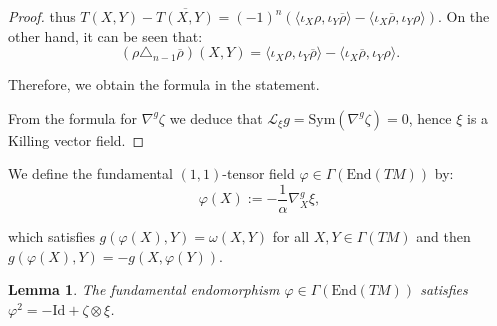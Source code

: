 \documentclass[10pt,a4paper,twoside,reqno]{amsart}
\theoremstyle{plain}
\newtheorem{lemma}[thm]{Lemma}
\theoremstyle{definition}
\theoremstyle{remark}
\newcommand{\End}{\mathrm{End}}
\def\Id{\mathrm{Id}}
\newcommand{\escal}[1]{\langle#1\rangle}
\begin{document}
\begin{proof}
\noindent
thus $T(X,Y)-\overline{T(X,Y)}=(-1)^n(\escal{\iota_X\rho,\iota_Y\overline{\rho}}-\escal{\iota_X\overline{\rho},\iota_Y\rho})$. On the other hand, it can be seen that: $$(\rho\triangle_{n-1}\overline{\rho})(X,Y)=\escal{\iota_X\rho,\iota_Y\overline{\rho}}-\escal{\iota_X\overline{\rho},\iota_Y\rho}.$$

\noindent
Therefore, we obtain the formula in the statement.\medskip

From the formula for $\nabla^g\zeta$ we deduce that $\mathscr{L}_{\xi}g = \mathrm{Sym}(\nabla^g\zeta)=0$, hence $\xi$ is a Killing vector field.
\end{proof}

We define the fundamental $(1,1)$-tensor field $\varphi\in\Gamma(\mathrm{End}(TM))$ by:
\begin{equation*}
\varphi(X) := -\frac{1}{\alpha}\nabla_X^g\xi,
\end{equation*}

\noindent
which satisfies $g(\varphi(X),Y)=\omega(X,Y)$ for all $X,Y\in\Gamma(TM)$ and then $g(\varphi(X),Y)=-g(X,\varphi(Y))$.

\begin{lemma}\label{lemma:varphi_square}
The fundamental endomorphism $\varphi\in\Gamma(\End(TM))$ satisfies $\varphi^2=-\Id+\zeta\otimes\xi$.
\end{lemma}
\end{document}
